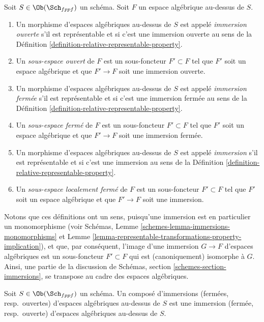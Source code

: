 \begin{definition}
\label{definition-immersion}
Soit $S \in \Ob(\Sch_{fppf})$ un schéma.
Soit $F$ un espace algébrique au-dessus de $S$.
\begin{enumerate}
\item Un morphisme d'espaces algébriques au-dessus de $S$
est appelé {\it immersion ouverte} s'il est représentable et si c'est une immersion ouverte
au sens de la Définition \ref{definition-relative-representable-property}.
\item Un {\it sous-espace ouvert} de $F$ est un sous-foncteur $F' \subset F$
tel que $F'$ soit un espace algébrique et que $F' \to F$ soit une
immersion ouverte.
\item Un morphisme d'espaces algébriques au-dessus de $S$
est appelé {\it immersion fermée} s'il est représentable et si c'est une immersion
fermée au sens de la
Définition \ref{definition-relative-representable-property}.
\item Un {\it sous-espace fermé} de $F$ est un sous-foncteur $F' \subset F$
tel que $F'$ soit un espace algébrique et que $F' \to F$ soit une
immersion fermée.
\item Un morphisme d'espaces algébriques au-dessus de $S$
est appelé {\it immersion} s'il est représentable et si c'est une immersion
au sens de la Définition \ref{definition-relative-representable-property}.
\item Un {\it sous-espace localement fermé} de $F$ est un sous-foncteur $F' \subset F$
tel que $F'$ soit un espace algébrique et que $F' \to F$ soit une
immersion.
\end{enumerate}
\end{definition}

\noindent
Notons que ces définitions ont un sens, puisqu'une immersion
est en particulier un monomorphisme (voir
Schémas, Lemme \ref{schemes-lemma-immersions-monomorphisms}
et Lemme \ref{lemma-representable-transformations-property-implication}),
et que, par conséquent, l'image d'une
immersion $G \to F$ d'espaces algébriques est un sous-foncteur $F' \subset F$
qui est (canoniquement) isomorphe à $G$. Ainsi, une partie de la discussion
de Schémas, section \ref{schemes-section-immersions}, se transpose au
cadre des espaces algébriques.

\begin{lemma}
\label{lemma-composition-immersions}
Soit $S \in \Ob(\Sch_{fppf})$ un schéma.
Un composé d'immersions (fermées, resp.\ ouvertes)
d'espaces algébriques au-dessus de $S$ est une immersion (fermée, resp.\ ouverte)
d'espaces algébriques au-dessus de $S$.
\end{lemma}

